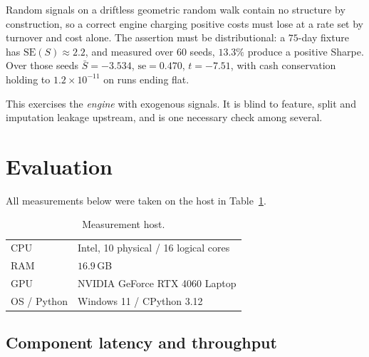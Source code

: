 \documentclass[preprint,12pt,authoryear]{elsarticle}
\begin{document}
Random signals on a driftless geometric random walk contain no structure by
construction, so a correct engine charging positive costs must lose at a rate set
by turnover and cost alone. The assertion must be distributional: a $75$-day
fixture has $\mathrm{SE}(S) \approx 2.2$, and measured over $60$ seeds,
$13.3\%$ produce a positive Sharpe. Over those seeds $\bar{S} = -3.534$,
$\mathrm{se} = 0.470$, $t = -7.51$, with cash conservation holding to
$1.2\times10^{-11}$ on runs ending flat.

This exercises the \emph{engine} with exogenous signals. It is blind to feature,
split and imputation leakage upstream, and is one necessary check among several.

\section{Evaluation}
\label{sec:eval}

All measurements below were taken on the host in Table~\ref{tab:host}.

\begin{table}[t]\centering\small
\caption{Measurement host.}
\label{tab:host}
\begin{tabular}{@{}ll@{}}
\toprule
CPU & Intel, 10 physical / 16 logical cores \\
RAM & $16.9$\,GB \\
GPU & NVIDIA GeForce RTX 4060 Laptop \\
OS / Python & Windows 11 / CPython 3.12 \\
\bottomrule
\end{tabular}
\end{table}

\subsection{Component latency and throughput}
\label{ssec:latency}
\end{document}
